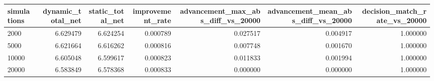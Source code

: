 \begin{tabular}{lrrrrrr}
\toprule
simulations & dynamic\_total\_net & static\_total\_net & improvement\_rate & advancement\_max\_abs\_diff\_vs\_20000 & advancement\_mean\_abs\_diff\_vs\_20000 & decision\_match\_rate\_vs\_20000 \\
\midrule
2000 & 6.629479 & 6.624254 & 0.000789 & 0.027517 & 0.004917 & 1.000000 \\
5000 & 6.621664 & 6.616262 & 0.000816 & 0.007748 & 0.001670 & 1.000000 \\
10000 & 6.605048 & 6.599617 & 0.000823 & 0.011833 & 0.001994 & 1.000000 \\
20000 & 6.583849 & 6.578368 & 0.000833 & 0.000000 & 0.000000 & 1.000000 \\
\bottomrule
\end{tabular}
